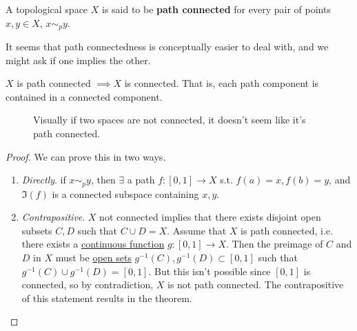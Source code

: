   \begin{definition}
    \label{def:path-connected-space}
 
     A topological space $X$ is said to be \textbf{path connected} for every pair of points $x, y \in X$, $x \sim_p y$. 
  \end{definition}

  It seems that path connectedness is conceptually easier to deal with, and we might ask if one implies the other. 

  \begin{theorem}
    \label{thm:path-connectedness-implies-connectedness}
    $X$ is path connected $\implies X$ is connected. That is, each path component is contained in a connected component. 

    \begin{figure}[H]
      \centering 
      \caption{Visually if two spaces are not connected, it doesn't seem like it's path connected. }
      \label{fig:path_vs_reg_connectedness}
    \end{figure}
  \end{theorem}
  \begin{proof} 
    We can prove this in two ways. 
    \begin{enumerate}
      \item \textit{Directly}. if $x \sim_p y$, then $\exists$ a path $f: [0, 1] \rightarrow X$ s.t. $f(a) = x, f(b) = y$, and $\Im(f)$ is a connected subspace containing $x, y$. 

      \item \textit{Contrapositive}. $X$ not connected implies that there exists disjoint open subsets $C, D$ such that $C \cup D = X$. Assume that $X$ is path connected, i.e. there exists a \hyperref[def:continuous_func]{continuous function} $g: [0,1] \to X$. Then the preimage of $C$ and $D$ in $X$ must be \hyperref[def:open-set]{open sets} $g^{-1} (C), g^{-1} (D) \subset [0,1]$ such that $g^{-1}(C) \cup g^{-1}(D) = [0,1]$. But this isn't possible since $[0,1]$ is connected, so by contradiction, $X$ is not path connected. The contrapositive of this statement results in the theorem. 
    \end{enumerate}
  \end{proof} 

